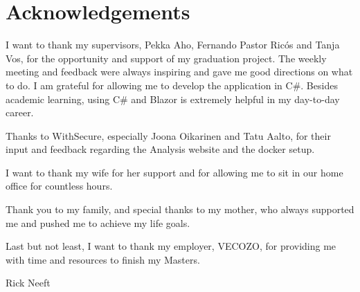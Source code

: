 \chapter*{Acknowledgements}

I want to thank my supervisors, Pekka Aho, Fernando Pastor Ricós and Tanja Vos, for the opportunity and support of my graduation project. The weekly meeting and feedback were always inspiring and gave me good directions on what to do. I am grateful for allowing me to develop the application in C\#. Besides academic learning, using C\# and Blazor is extremely helpful in my day-to-day career.

Thanks to WithSecure, especially Joona Oikarinen and Tatu Aalto, for their input and feedback regarding the Analysis website and the docker setup.

I want to thank my wife for her support and for allowing me to sit in our home office for countless hours. 

Thank you to my family, and special thanks to my mother, who always supported me and pushed me to achieve my life goals. 

Last but not least, I want to thank my employer, VECOZO, for providing me with time and resources to finish my Masters. 

Rick Neeft\\
\myPresentationDate